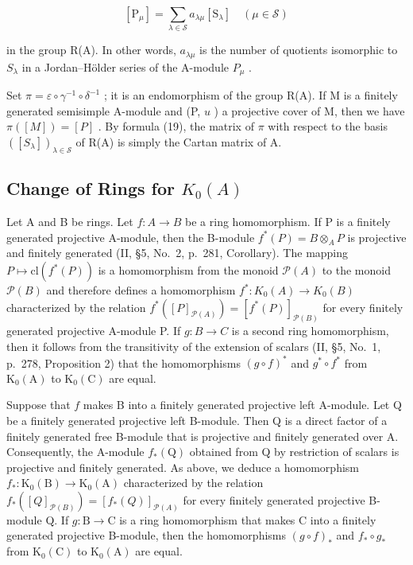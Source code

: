 \[
[ \mathrm{P} _ {\mu} ] = \sum_ {\lambda \in \mathcal {S}} a _ {\lambda \mu} [ \mathrm{S} _ {\lambda} ] \quad (\mu \in \mathcal {S})\tag{19}
\]

in the group R(A). In other words, \(a_{\lambda\mu}\) is the number of quotients isomorphic to \(S_{\lambda}\) in a Jordan--Hölder series of the A-module \(P_{\mu}\) .

Set \(\pi = \varepsilon \circ \gamma^{-1} \circ \delta^{-1}\) ; it is an endomorphism of the group R(A). If M is a finitely generated semisimple A-module and (P, \(u\) ) a projective cover of M, then we have \(\pi([M]) = [P]\) . By formula (19), the matrix of \(\pi\) with respect to the basis \(([S_{\lambda}])_{\lambda \in \mathcal{S}}\) of R(A) is simply the Cartan matrix of A.

\subsection{\texorpdfstring{Change of Rings for \(K_{0}(A)\)}{Change of Rings for K\_\{0\}(A)}}

Let A and B be rings. Let \(f: A \to B\) be a ring homomorphism. If P is a finitely generated projective A-module, then the B-module \(f^{*}(P) = B \otimes_{A} P\) is projective and finitely generated (II, §5, No.~2, p.~281, Corollary). The mapping \(P \mapsto \text{cl}(f^{*}(P))\) is a homomorphism from the monoid \(\mathcal{P}(A)\) to the monoid \(\mathcal{P}(B)\) and therefore defines a homomorphism \(f^{*}: K_{0}(A) \to K_{0}(B)\) characterized by the relation \(f^{*}([P]_{\mathcal{P}(A)}) = [f^{*}(P)]_{\mathcal{P}(B)}\) for every finitely generated projective A-module P. If \(g: B \to C\) is a second ring homomorphism, then it follows from the transitivity of the extension of scalars (II, §5, No.~1, p.~278, Proposition 2) that the homomorphisms \((g \circ f)^*\) and \(g^{*} \circ f^{*}\) from \(\mathrm{K}_{0}(\mathrm{A})\) to \(\mathrm{K}_{0}(\mathrm{C})\) are equal.

Suppose that \(f\) makes B into a finitely generated projective left A-module. Let Q be a finitely generated projective left B-module. Then Q is a direct factor of a finitely generated free B-module that is projective and finitely generated over A. Consequently, the A-module \(f_{*}(\mathrm{Q})\) obtained from Q by restriction of scalars is projective and finitely generated. As above, we deduce a homomorphism \(f_{*}: \mathrm{K}_{0}(\mathrm{B}) \to \mathrm{K}_{0}(\mathrm{A})\) characterized by the relation \(f_{*}([Q]_{\mathcal{P}(B)}) = [f_{*}(Q)]_{\mathcal{P}(A)}\) for every finitely generated projective B-module Q. If \(g: \mathrm{B} \to \mathrm{C}\) is a ring homomorphism that makes C into a finitely generated projective B-module, then the homomorphisms \((g \circ f)_{*}\) and \(f_{*} \circ g_{*}\) from \(\mathrm{K}_{0}(\mathrm{C})\) to \(\mathrm{K}_{0}(\mathrm{A})\) are equal.

